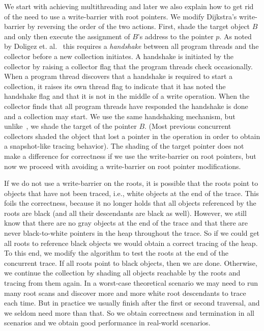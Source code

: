 We start with achieving multithreading and later we also explain how to get rid of the need to use a write-barrier with root pointers.
We modify Dijkstra's write-barrier by reversing the order of the two actions.
First, shade the target object $B$ and only then execute the assignment of $B$'s address to the pointer $p$.
As noted by Doligez et. al.~\cite{doli93,doli94} this requires a {\em handshake}
between all program threads and the collector before a new collection initiates.
A handshake is initiated by the collector by raising a collector flag that the program threads check occasionally.
When a program thread discovers that a handshake is required to start a collection,
it raises its own thread flag to indicate that it has noted the handshake flag and that it is not in the middle of a write operation.
When the collector finds that all program threads have responded the handshake is done and a collection may start.
We use the same handshaking mechanism, but unlike~\cite{doli93,doli94},
we shade the target of the pointer $B$.
(Most previous concurrent collectors shaded the object that lost a pointer in the operation in order to obtain a snapshot-like tracing behavior).
The shading of the target pointer does not make a difference for
correctness if we use the write-barrier on root pointers, but now we proceed with avoiding a write-barrier on root pointer modifications. 

If we do not use a write-barrier on the roots,
it is possible that the roots point to objects that have not been traced,
i.e., white objects at the end of the trace.
This foils the correctness,
because it no longer holds that all objects referenced by the roots are black (and all their descendants are black as well).
However, we still know that there are no gray objects at the end of the trace
and that there are never black-to-white pointers in the heap throughout the trace.
So if we could get all roots to reference black objects we would obtain a correct tracing of the heap.
To this end, we modify the algorithm to test the roots at the end of the concurrent trace.
If all roots point to black objects, then we are done.
Otherwise, we continue the collection by shading all objects reachable by the roots and tracing from them again. 
In a worst-case theoretical scenario we may need to run many root scans and discover more and more white root descendants to trace each time. 
But in practice we usually finish after the first or second traversal, and we seldom need more than that.
So we obtain correctness and termination in all scenarios and we obtain good performance in real-world scenarios. 

